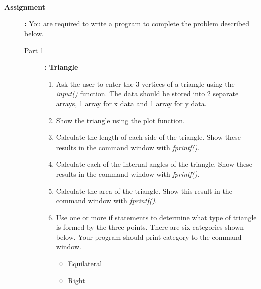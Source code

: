 \documentclass[11pt]{article}
\begin{document}
\begin{description}
\begin{itemize}
         \vspace{2mm}\\
         \vspace{2mm}\\
         \vspace{2mm}\\    
        
        
        
        

    \end{itemize}
 \vspace{20mm}
 
\newpage
\item [\textbf{Assignment}]\textbf{:} You are required to write a program to complete the problem described below.
			\begin{description}
			\item[Part 1]\textbf{: Triangle}
			\begin{enumerate}
				\item Ask the user to enter the 3 vertices of a triangle using the {\it input()} function. The data should be stored into 2 separate arrays, 1 array for x data and 1 array for y data.  \\
		\item Show the triangle using the plot function. \\
                \item Calculate the length of each side of the triangle. Show these results in the command window with {\it fprintf()}. \\
		\item Calculate each of the internal angles of the triangle. Show these results in the command window  with {\it fprintf()}. \\  
			\item Calculate the area of the triangle. Show this result in the command window  with {\it fprintf()}. \\  
			\item Use one or more if statements to determine what type of triangle is formed by the three points. There are six categories shown below. Your program should print category to the command window. \\
\begin{itemize}
\item Equilateral
\item Right

\end{itemize}
\end{enumerate}
\end{description}
\end{description}
\end{document}
